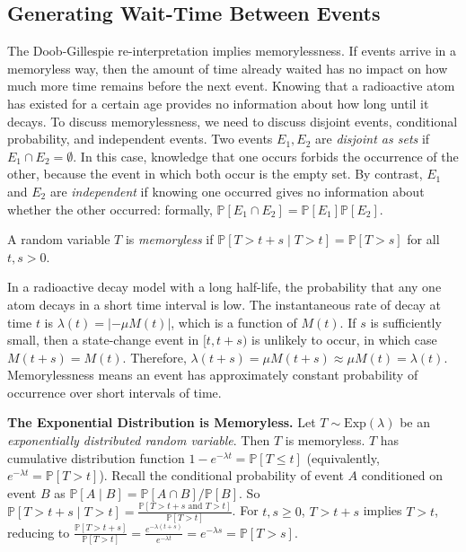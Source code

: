 \subsection{Generating Wait-Time Between Events}\label{subsec:wait_time_prelim}





The Doob-Gillespie re-interpretation implies memorylessness. If events arrive in a memoryless way, then the amount of time already waited has no impact on how much more time remains before the next event. Knowing that a radioactive atom has existed for a certain age provides no information about how long until it decays. To discuss memorylessness, we need to discuss disjoint events, conditional probability, and independent events.
Two events $E_1, E_2$ are \textit{disjoint as sets} if $E_1 \cap E_2 = \emptyset$. In this case, knowledge that one occurs forbids the occurrence of the other, because the event in which both occur is the empty set. By contrast, $E_1$ and $E_2$ are \textit{independent} if knowing one occurred gives no information about whether the other occurred: formally, $\mathbb{P}[E_1 \cap E_2] = \mathbb{P}[E_1]\mathbb{P}[E_2]$.

\begin{definition}\label{def:memoryless}
A random variable $T$ is \textit{memoryless} if $\mathbb{P}[T > t + s \mid T > t] = \mathbb{P}[T > s]$ for all $t, s > 0$.
\end{definition}


In a radioactive decay model with a long half-life, the probability that any one atom decays in a short time interval is low. The instantaneous rate of decay at time $t$ is $\lambda(t) = \left|-\mu M(t)\right|$, which is a function of $M(t)$. If $s$ is sufficiently small, then a state-change event in $[t, t + s)$ is unlikely to occur, in which case $M(t+s) = M(t)$. Therefore, $\lambda(t+s) = \mu M(t+s) \approx \mu M(t) = \lambda(t)$. Memorylessness means an event has approximately constant probability of occurrence over short intervals of time.

\begin{example}\label{ex:exponential_memoryless}
\textbf{The Exponential Distribution is Memoryless.}
Let $T \sim \text{Exp}(\lambda)$ be an \textit{exponentially distributed random variable}. Then $T$ is memoryless. $T$ has cumulative distribution function $1 - e^{-\lambda t} = \mathbb{P}[T \leq t]$ (equivalently, $e^{-\lambda t} = \mathbb{P}[T > t]$). Recall the conditional probability of event $A$ conditioned on event $B$ as $\mathbb{P}[A \mid B] = \mathbb{P}[A \cap B]/\mathbb{P}[B]$. So $\mathbb{P}[T > t + s \mid T > t] = \tfrac{\mathbb{P}[T > t + s\text{ and } T > t]}{\mathbb{P}[T > t]}$. For $t, s \geq 0$, $T > t + s$ implies $T > t$, reducing to $\frac{\mathbb{P}[T > t + s]}{\mathbb{P}[T > t]} = \frac{e^{-\lambda (t + s)}}{e^{-\lambda t}} = e^{-\lambda s} = \mathbb{P}[T > s]$.
\end{example}

